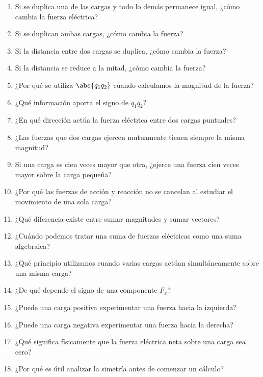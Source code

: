 \begin{enumerate}

    \item Si se duplica una de las cargas y todo lo demás permanece igual,
    ¿cómo cambia la fuerza eléctrica?

    \item Si se duplican ambas cargas, ¿cómo cambia la fuerza?

    \item Si la distancia entre dos cargas se duplica, ¿cómo cambia la
    fuerza?

    \item Si la distancia se reduce a la mitad, ¿cómo cambia la fuerza?

    \item ¿Por qué se utiliza \(\abs{q_1q_2}\) cuando calculamos la magnitud
    de la fuerza?

    \item ¿Qué información aporta el signo de \(q_1q_2\)?

    \item ¿En qué dirección actúa la fuerza eléctrica entre dos cargas
    puntuales?

    \item ¿Las fuerzas que dos cargas ejercen mutuamente tienen siempre la
    misma magnitud?

    \item Si una carga es cien veces mayor que otra, ¿ejerce una fuerza cien
    veces mayor sobre la carga pequeña?

    \item ¿Por qué las fuerzas de acción y reacción no se cancelan al
    estudiar el movimiento de una sola carga?

    \item ¿Qué diferencia existe entre sumar magnitudes y sumar vectores?

    \item ¿Cuándo podemos tratar una suma de fuerzas eléctricas como una
    suma algebraica?

    \item ¿Qué principio utilizamos cuando varias cargas actúan
    simultáneamente sobre una misma carga?

    \item ¿De qué depende el signo de una componente \(F_x\)?

    \item ¿Puede una carga positiva experimentar una fuerza hacia la
    izquierda?

    \item ¿Puede una carga negativa experimentar una fuerza hacia la
    derecha?

    \item ¿Qué significa físicamente que la fuerza eléctrica neta sobre una
    carga sea cero?

    \item ¿Por qué es útil analizar la simetría antes de comenzar un
    cálculo?

\end{enumerate}


